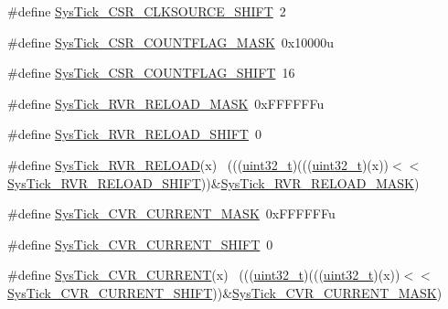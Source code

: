 \begin{DoxyCompactItemize}
\item 
\#define \hyperlink{group___sys_tick___register___masks_ga99922ae5d9a4c34aa9e2c1673c65d8a4}{Sys\+Tick\+\_\+\+C\+S\+R\+\_\+\+C\+L\+K\+S\+O\+U\+R\+C\+E\+\_\+\+S\+H\+I\+FT}~2
\item 
\#define \hyperlink{group___sys_tick___register___masks_ga5ae827629fd47e5a050f706576f7b425}{Sys\+Tick\+\_\+\+C\+S\+R\+\_\+\+C\+O\+U\+N\+T\+F\+L\+A\+G\+\_\+\+M\+A\+SK}~0x10000u
\item 
\#define \hyperlink{group___sys_tick___register___masks_ga9764e4e8c4ee1b8383ec52f061bd1c87}{Sys\+Tick\+\_\+\+C\+S\+R\+\_\+\+C\+O\+U\+N\+T\+F\+L\+A\+G\+\_\+\+S\+H\+I\+FT}~16
\item 
\#define \hyperlink{group___sys_tick___register___masks_gaec96452b3f6bd6a6ca6496cbbad9a9aa}{Sys\+Tick\+\_\+\+R\+V\+R\+\_\+\+R\+E\+L\+O\+A\+D\+\_\+\+M\+A\+SK}~0x\+F\+F\+F\+F\+F\+Fu
\item 
\#define \hyperlink{group___sys_tick___register___masks_gaada5987ab8604965af6e1437c97ee963}{Sys\+Tick\+\_\+\+R\+V\+R\+\_\+\+R\+E\+L\+O\+A\+D\+\_\+\+S\+H\+I\+FT}~0
\item 
\#define \hyperlink{group___sys_tick___register___masks_gabe33788bbfefe67549f0da8cabbc2495}{Sys\+Tick\+\_\+\+R\+V\+R\+\_\+\+R\+E\+L\+O\+AD}(x)                                    ~(((\hyperlink{_p_e___types_8h_a33594304e786b158f3fb30289278f5af}{uint32\+\_\+t})(((\hyperlink{_p_e___types_8h_a33594304e786b158f3fb30289278f5af}{uint32\+\_\+t})(x))$<$$<$\hyperlink{group___sys_tick___register___masks_gaada5987ab8604965af6e1437c97ee963}{Sys\+Tick\+\_\+\+R\+V\+R\+\_\+\+R\+E\+L\+O\+A\+D\+\_\+\+S\+H\+I\+FT}))\&\hyperlink{group___sys_tick___register___masks_gaec96452b3f6bd6a6ca6496cbbad9a9aa}{Sys\+Tick\+\_\+\+R\+V\+R\+\_\+\+R\+E\+L\+O\+A\+D\+\_\+\+M\+A\+SK})
\item 
\#define \hyperlink{group___sys_tick___register___masks_ga24c6d345c97c669b426339ffda71aa8b}{Sys\+Tick\+\_\+\+C\+V\+R\+\_\+\+C\+U\+R\+R\+E\+N\+T\+\_\+\+M\+A\+SK}~0x\+F\+F\+F\+F\+F\+Fu
\item 
\#define \hyperlink{group___sys_tick___register___masks_ga1e9eb575c58a4638dabd21775fa22c19}{Sys\+Tick\+\_\+\+C\+V\+R\+\_\+\+C\+U\+R\+R\+E\+N\+T\+\_\+\+S\+H\+I\+FT}~0
\item 
\#define \hyperlink{group___sys_tick___register___masks_ga97b2a7bb2c882eb623545fdad8b93316}{Sys\+Tick\+\_\+\+C\+V\+R\+\_\+\+C\+U\+R\+R\+E\+NT}(x)                                  ~(((\hyperlink{_p_e___types_8h_a33594304e786b158f3fb30289278f5af}{uint32\+\_\+t})(((\hyperlink{_p_e___types_8h_a33594304e786b158f3fb30289278f5af}{uint32\+\_\+t})(x))$<$$<$\hyperlink{group___sys_tick___register___masks_ga1e9eb575c58a4638dabd21775fa22c19}{Sys\+Tick\+\_\+\+C\+V\+R\+\_\+\+C\+U\+R\+R\+E\+N\+T\+\_\+\+S\+H\+I\+FT}))\&\hyperlink{group___sys_tick___register___masks_ga24c6d345c97c669b426339ffda71aa8b}{Sys\+Tick\+\_\+\+C\+V\+R\+\_\+\+C\+U\+R\+R\+E\+N\+T\+\_\+\+M\+A\+SK})

\end{DoxyCompactItemize}
